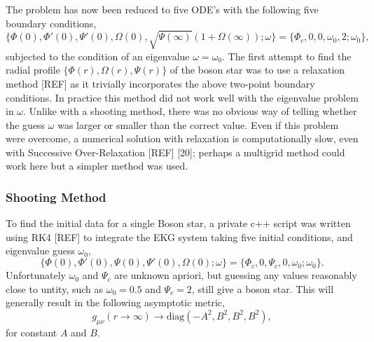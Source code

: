 The problem has now been reduced to five ODE's with the following five boundary conditions,
\begin{equation} \{\Phi(0),\Phi'(0),\Psi'(0),\Omega(0),\sqrt{\Psi(\infty)}\left(1+\Omega(\infty)\right);\omega \} = \{ \Phi_c,0,0,\omega_0,2;\omega_0\},\end{equation}
subjected to the condition of an eigenvalue $\omega=\omega_0$. The first attempt to find the radial profile $\{\Phi(r), \Omega(r), \Psi(r)\}$ of the boson star was to use a relaxation 
method [REF] as it trivially incorporates the above two-point boundary conditions. In practice this method did not work well with the eigenvalue problem in $\omega$.
Unlike with a shooting method, there was no obvious way of telling whether the guess $\omega$ was larger or
smaller than the correct value. Even if this problem were overcome, a numerical solution with relaxation is computationally slow, even with Successive Over-Relaxation [REF] [20]; perhaps a multigrid method could work here but a simpler method was used.


\subsubsection{Shooting Method}

To find the initial data for a single Boson star, a private {c++} script was written using RK4 [REF] to integrate the EKG system taking five initial conditions, and eigenvalue guess $\omega_0$, 
\begin{equation} \{\Phi(0),\Phi'(0),\Psi(0),\Psi'(0),\Omega(0);\omega \} = \{ \Phi_c,0,\Psi_c,0,\omega_0;\omega_0\}.\end{equation}
Unfortunately $\omega_0$ and $\Psi_c$ are unknown apriori, but guessing any values reasonably close to untity, such as $\omega_0=0.5$ and $\Psi_c=2$, still give a boson star. This will generally result in the following asymptotic metric,
\begin{equation} g_{\mu\nu}(r\rightarrow\infty) \rightarrow \mathrm{diag}(-A^2,B^2,B^2,B^2), \label{grchombo:eq:ABBB}\end{equation}
 for constant $A$ and $B$. 

